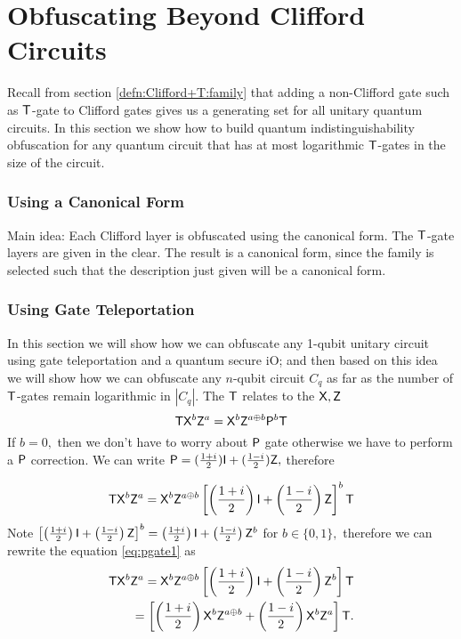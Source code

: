 \section{Obfuscating Beyond Clifford Circuits}
\label{QiO:Clifford+T:family}
Recall from  section \ref{defn:Clifford+T:family} that adding a non-Clifford gate  such as ${\sf T}$-gate to Clifford gates gives us a generating set for all unitary quantum circuits. In this section we show how to build quantum indistinguishability obfuscation for any quantum circuit that has at most logarithmic  ${\sf T}$-gates in the size of the circuit.

\subsubsection{Using a Canonical Form}
Main idea: Each Clifford layer is obfuscated using the canonical form. The ${\sf T}$-gate layers are given in the clear. The result is a canonical form, since the family is selected such that the description just given will be a canonical form.


\subsubsection{Using Gate Teleportation}
In this section we will show how we can obfuscate any 1-qubit unitary circuit using gate teleportation and a quantum secure iO; and then based on this idea we will show how we can obfuscate any $n$-qubit circuit $C_q$ as far as the number of ${\sf T}$-gates remain logarithmic in $|C_q|.$ The ${\sf T}$ relates to the ${\sf X}, {\sf Z}$
$${\sf T} {\sf X}^b {\sf Z}^a={\sf X}^b {\sf Z}^{a\oplus b}{\sf P}^b {\sf T}$$
If $b=0,$ then we don't have to worry about ${\sf P}$ gate otherwise we have to perform a ${\sf P}$ correction. We can write ${\sf P}=(\frac{1+i}{2}) {\sf I} + (\frac{1-i}{2}){\sf Z},$ therefore

\begin{equation}
\label{eq:pgate1}
{\sf T} {\sf X}^b {\sf Z}^a={\sf X}^b {\sf Z}^{a\oplus b}\left[\left(\frac{1+i}{2}\right) {\sf I} + \left(\frac{1-i}{2}\right){\sf Z}\right]^b {\sf T}
\end{equation}
Note  $\left[\left(\frac{1+i}{2}\right) {\sf I} + \left(\frac{1-i}{2}\right){\sf Z}\right]^b=\left(\frac{1+i}{2}\right) {\sf I} + \left(\frac{1-i}{2}\right){\sf Z}^b$ for $b \in \{0,1\},$ therefore we can rewrite the equation \ref{eq:pgate1} as
\begin{equation}
\label{eq:pgate2}
\begin{aligned}
{\sf T} {\sf X}^b {\sf Z}^a={\sf X}^b {\sf Z}^{a\oplus b}\left[\left(\frac{1+i}{2}\right) {\sf I} + \left(\frac{1-i}{2}\right){\sf Z}^b\right] {\sf T} \\
=\left[\left(\frac{1+i}{2}\right) {\sf X}^b {\sf Z}^{a\oplus b} + \left(\frac{1-i}{2}\right){\sf X}^b {\sf Z}^a\right] {\sf T}. \\
\end{aligned}
\end{equation}

